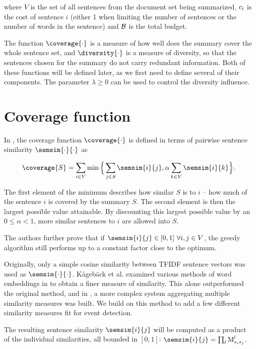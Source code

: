 where $V$ is the set of all sentences from the document set being summarized, $c_{i}$ is the cost of sentence $i$ (either 1 when limiting the number of sentences or the number of words in the sentence) and $\mathcal{B}$ is the total budget.

The function $\coverage{\cdot}$ is a measure of how well does the summary cover the whole sentence set, and $\diversity{\cdot}$ is a measure of diversity, so that the sentences chosen for the summary do not carry redundant information. Both of these functions will be defined later, as we first need to define several of their components. The parameter $\lambda \geq 0$ can be used to control the diversity influence.


\section{Coverage function}

In \cite{multi-summarization-2}, the coverage function $\coverage{\cdot}$ is defined in terms of pairwise sentence similarity $\semsim{\cdot}{\cdot}$ as

\begin{equation}
\coverage{S} = \sum_{i \in V}{\min{\Big\{ \sum_{j \in S}{\semsim{i}{j}}, \alpha \sum_{k \in V}{\semsim{i}{k}} \Big\} }}.
\end{equation}

The first element of the minimum describes how similar $S$ is to $i$ -- how much of the sentence $i$ is covered by the summary $S$. The second element is then the largest possible value attainable. By discounting this largest possible value by an $0 \leq \alpha < 1$, more similar sentences to $i$ are allowed into $S$.

The authors further prove that if $\semsim{i}{j} \in [0,1]\ \forall i, j \in V$, the greedy algorithm still performs up to a constant factor close to the optimum.

Originally, only a simple cosine similarity between TFIDF sentence vectors \cite{information-retrieval} was used as $\semsim{\cdot}{\cdot}$. Kågebäck et al. examined various methods of word embeddings in \cite{mogren-1} to obtain a finer measure of similarity. This alone outperformed the original method, and in \cite{mogren-2}, a more complex system aggregating multiple similarity measures was built. We build on this method to add a few different similarity measures fit for event detection.

The resulting sentence similarity $\semsim{i}{j}$ will be computed as a product of the individual similarities, all bounded in $[0, 1]$: $\semsim{i}{j} = \prod_{l}{\similarity_{s_{i}s_{j}}^{l}}$.

